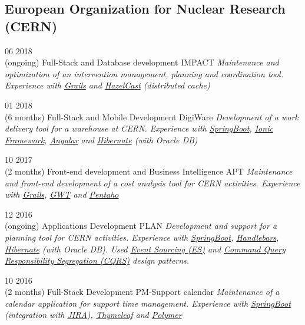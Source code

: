\documentclass[]{friggeri-cv}
\begin{document}
	\subsection{European Organization for Nuclear Research (CERN)}  
		\begin{entrylist}

			\entry
			{06 2018\\(ongoing)}
			{Full-Stack and Database development}
			{IMPACT}
			{\emph{Maintenance and optimization of an intervention management, planning and coordination tool. Experience with \underline{Grails} and \underline{HazelCast} (distributed cache)} }

			\entry
			{01 2018\\(6 months)}
			{Full-Stack and Mobile Development}
			{DigiWare}
			{\emph{Development of a work delivery tool for a warehouse at CERN. Experience with \underline{SpringBoot}, \underline{Ionic Framework}, \underline{Angular} and \underline{Hibernate} (with Oracle DB) } }

			\entry
			{10 2017\\(2 months)}
			{Front-end development and Business Intelligence}
			{APT}
			{\emph{Maintenance and front-end development of a cost analysis tool for CERN activities. Experience with \underline{Grails}, \underline{GWT} and \underline{Pentaho} } }

			\entry
			{12 2016\\(ongoing)}
			{Applications Development}
			{PLAN}
			{\emph{Development and support for a planning tool for CERN activities. Experience with \underline{SpringBoot}, \underline{Handlebars}, \underline{Hibernate} (with Oracle DB). Used \underline{Event Sourcing (ES)} and \underline{Command Query Responsibility Segregation (CQRS)} design patterns. } }

			\entry
			{10 2016\\(2 months)}
			{Full-Stack Development}
			{PM-Support calendar}
			{\emph{Maintenance of a calendar application for support time management. Experience with \underline{SpringBoot} (integration with \underline{JIRA}), \underline{Thymeleaf} and \underline{Polymer}}}


		\end{entrylist}
\end{document}
